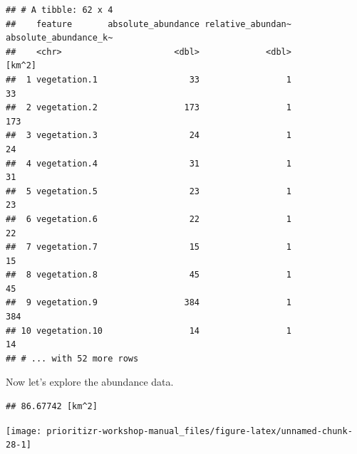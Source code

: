\documentclass[12pt,]{book}
\newenvironment{Shaded}{\begin{snugshade}}{\end{snugshade}}
\newcommand{\KeywordTok}[1]{\textcolor[rgb]{0.13,0.29,0.53}{\textbf{#1}}}
\newcommand{\DataTypeTok}[1]{\textcolor[rgb]{0.13,0.29,0.53}{#1}}
\newcommand{\StringTok}[1]{\textcolor[rgb]{0.31,0.60,0.02}{#1}}
\newcommand{\CommentTok}[1]{\textcolor[rgb]{0.56,0.35,0.01}{\textit{#1}}}
\newcommand{\OperatorTok}[1]{\textcolor[rgb]{0.81,0.36,0.00}{\textbf{#1}}}
\newcommand{\NormalTok}[1]{#1}
\begin{document}
\begin{verbatim}
## # A tibble: 62 x 4
##    feature       absolute_abundance relative_abundan~ absolute_abundance_k~
##    <chr>                      <dbl>             <dbl>                [km^2]
##  1 vegetation.1                  33                 1                    33
##  2 vegetation.2                 173                 1                   173
##  3 vegetation.3                  24                 1                    24
##  4 vegetation.4                  31                 1                    31
##  5 vegetation.5                  23                 1                    23
##  6 vegetation.6                  22                 1                    22
##  7 vegetation.7                  15                 1                    15
##  8 vegetation.8                  45                 1                    45
##  9 vegetation.9                 384                 1                   384
## 10 vegetation.10                 14                 1                    14
## # ... with 52 more rows
\end{verbatim}

Now let's explore the abundance data.

\begin{Shaded}
\end{Shaded}

\begin{verbatim}
## 86.67742 [km^2]
\end{verbatim}

\begin{Shaded}
\end{Shaded}

\begin{center}\texttt{[image: prioritizr-workshop-manual\_files/figure-latex/unnamed-chunk-28-1]} \end{center}

\begin{Shaded}
\end{Shaded}
\end{document}
